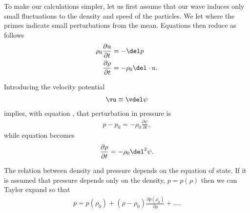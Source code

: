 To make our calculations simpler, let us first assume that our wave induces only small fluctuations to the density and speed of the particles.
We let 
where the primes indicate  small perturbations from the mean.
Equations  then reduce as follows
\begin{align}
 \rho_0  \frac{\partial u}{\partial t} &= - \del p \label{eqn:euclidianNSLinear} \\
 \frac{\partial \rho }{\partial t} &=  - \rho_0  \del \cdot u. \label{eqn:euclidianContinuityLinear}
\end{align}

Introducing the velocity potential
\begin{align}
 \vu \equiv \vdel \psi
\end{align}
implies, with equation , that perturbation in pressure is
\begin{align}
p-p_0 = -\rho_0 \frac{\partial \psi}{\partial t},
\end{align}
while equation  becomes
\begin{align}
\frac{\partial \rho}{\partial t} = - \rho_0 \del^2 \psi.
\end{align}

The relation between density and pressure depends on the equation of state.  
If it is assumed that pressure depends only on the density, $p=p(\rho)$
then we can Taylor expand so that
\begin{align}
p = p(\rho_0) + (\rho-\rho_0) \frac{\partial p(\rho_0)}{\partial \rho} + \ldots.
\end{align}

